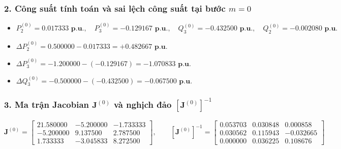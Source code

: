 \documentclass[10.5pt,a4paper]{article}
\begin{document}
\vspace{-6pt}
\subsubsection*{2. Công suất tính toán và sai lệch công suất tại bước $m=0$}
\vspace{-4pt}
\begin{itemize}\setlength{\itemsep}{1pt}\setlength{\parskip}{0pt}
    \item $P_2^{(0)} = \mathbf{0.017333\text{ p.u.}}, \quad P_3^{(0)} = \mathbf{-0.129167\text{ p.u.}}, \quad Q_3^{(0)} = \mathbf{-0.432500\text{ p.u.}}, \quad Q_2^{(0)} = \mathbf{-0.002080\text{ p.u.}}$
    \item $\Delta P_2^{(0)} = 0.500000 - 0.017333 = \mathbf{+0.482667\text{ p.u.}}$
    \item $\Delta P_3^{(0)} = -1.200000 - (-0.129167) = \mathbf{-1.070833\text{ p.u.}}$
    \item $\Delta Q_3^{(0)} = -0.500000 - (-0.432500) = \mathbf{-0.067500\text{ p.u.}}$
\end{itemize}

\vspace{-6pt}
\subsubsection*{3. Ma trận Jacobian $\mathbf{J}^{(0)}$ và nghịch đảo $[\mathbf{J}^{(0)}]^{-1}$}
\vspace{-4pt}
\begin{equation}
\mathbf{J}^{(0)} =
\begin{bmatrix}
21.580000 & -5.200000 & -1.733333 \\
-5.200000 & 9.137500 & 2.787500 \\
1.733333 & -3.045833 & 8.272500
\end{bmatrix}, \qquad
[\mathbf{J}^{(0)}]^{-1} =
\begin{bmatrix}
0.053703 & 0.030848 & 0.000858 \\
0.030562 & 0.115943 & -0.032665 \\
0.000000 & 0.036225 & 0.108676
\end{bmatrix}
\end{equation}

\vspace{-6pt}
\end{document}
